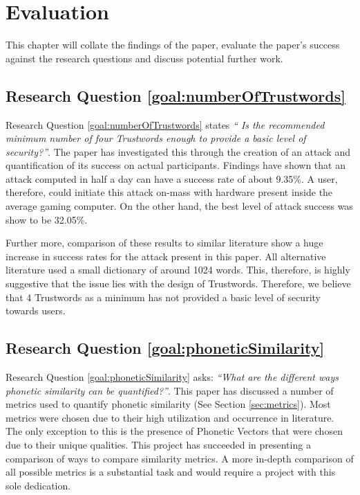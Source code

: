 \chapter{Evaluation}
This chapter will collate the findings of the paper, evaluate the paper's success against the research questions and discuss potential further work.

\section{Research Question \ref{goal:numberOfTrustwords}}
Research Question \ref{goal:numberOfTrustwords} states \textit{`` Is the recommended minimum number of four Trustwords enough to provide a basic level of security?''}. The paper has investigated this through the creation of an attack and quantification of its success on actual participants. Findings have shown that an attack computed in half a day can have a success rate of about 9.35\%. A user, therefore, could initiate this attack on-mass with hardware present inside the average gaming computer. On the other hand, the best level of attack success was show to be 32.05\%. 

Further more, comparison of these results to similar literature show a huge increase in success rates for the attack present in this paper. All alternative literature used a small dictionary of around 1024 words. This, therefore, is highly suggestive that the issue lies with the design of Trustwords. Therefore, we believe that 4 Trustwords as a minimum has not provided a basic level of security towards users.


\section{Research Question \ref{goal:phoneticSimilarity}}

Research Question \ref{goal:phoneticSimilarity} asks: \textit{``What are the different ways phonetic similarity can be quantified?''}. This paper has discussed a number of metrics used to quantify phonetic similarity (See Section \ref{sec:metrics}). Most metrics were chosen due to their high utilization and occurrence in literature. The only exception to this is the presence of Phonetic Vectors that were chosen due to their unique qualities. This project has succeeded in presenting a comparison of ways to compare similarity metrics. A more in-depth comparison of all possible metrics is a substantial task and would require a project with this sole dedication.

